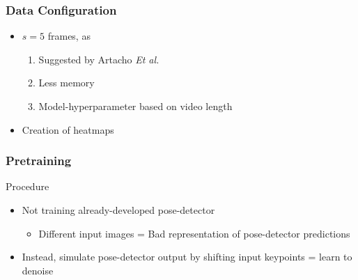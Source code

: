 \documentclass{beamer}
\begin{document}
\begin{frame}
    \frametitle{Data Configuration}
    \begin{itemize}
        \item<1-> $s = 5$ frames, as 
        \begin{enumerate}
            \item<1-> Suggested by Artacho \textit{Et al.}
            \item<1-> Less memory
            \item<1-> Model-hyperparameter based on video length
        \end{enumerate}
        \item<2-> Creation of heatmaps
    \end{itemize}

    
\end{frame}

\begin{frame}
    \frametitle{Pretraining}
    Procedure
    \begin{itemize}
        \item<1-> Not training already-developed pose-detector
        \begin{itemize}
            \item Different input images = Bad representation of pose-detector predictions
        \end{itemize}
        \item<2-> Instead, simulate pose-detector output by shifting input keypoints = learn to denoise
    \end{itemize}
\end{frame}
\end{document}
